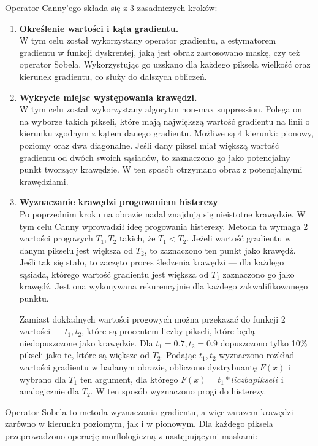\documentclass[a4paper,11pt,twoside]{report}
\theoremstyle{definition}
\begin{document}
Operator Canny'ego \cite{Canny} składa się z 3 zasadniczych kroków:
\begin{enumerate}%
\item \textbf {Określenie wartości i kąta gradientu.} \\
W tym celu został wykorzystany operator gradientu, a estymatorem gradientu w funkcji dyskrentej, jaką jest obraz zastosowano maskę, czy też operator Sobela. Wykorzystując go uzskano dla każdego piksela wielkość oraz kierunek gradientu, co służy do dalszych obliczeń. 
\item \textbf {Wykrycie miejsc występowania krawędzi.} \\
W tym celu został wykorzystany algorytm non-max suppression. Polega on na wyborze takich pikseli, które mają największą wartość gradientu na linii o kierunku zgodnym z kątem danego gradientu. Możliwe są 4 kierunki: pionowy, poziomy oraz dwa diagonalne. Jeśli dany piksel miał większą wartość gradientu od dwóch swoich sąsiadów, to zaznaczono go jako potencjalny punkt tworzący krawędzie. W ten sposób otrzymano obraz z potencjalnymi krawędziami.
\item \textbf {Wyznaczanie krawędzi progowaniem histerezy} \\
Po poprzednim kroku na obrazie nadal znajdują się nieistotne krawędzie. W tym celu Canny wprowadził ideę progowania histerezy. Metoda ta wymaga 2 wartości progowych $T_1, T_2$ takich, że $T_1 < T_2$. Jeżeli wartość gradientu w danym pikselu jest większa od $T_2$, to zaznaczono ten punkt jako krawędź. Jeśli tak się stało, to zaczęto proces śledzenia krawędzi --- dla każdego sąsiada, którego wartość gradientu jest większa od $T_1$ zaznaczono go jako krawędź. Jest ona wykonywana rekurencyjnie dla każdego zakwalifikowanego punktu. 

Zamiast dokładnych wartości progowych można przekazać do funkcji 2 wartości --- $t_1, t_2$, które są procentem liczby pikseli, które będą niedopuszczone jako krawędzie. Dla $t_1 = 0.7, t_2 = 0.9$ dopuszczono tylko 10\% pikseli jako te, które są większe od $T_2$. Podając $t_1, t_2$ wyznaczono rozkład wartości gradientu w badanym obrazie, obliczono dystrybuantę $F(x)$ i wybrano dla $T_1$ ten argument, dla którego $F(x) = t_1 * liczba pikseli$ i analogicznie dla $T_2$. W ten sposób wyznaczono progi do histerezy.

\end{enumerate}

Operator Sobela \cite{Sobel} to metoda wyznaczania gradientu, a więc zarazem krawędzi zarówno w kierunku poziomym, jak i w pionowym. Dla każdego piksela przeprowadzono operację morflologiczną z następującymi maskami:
\end{document}
